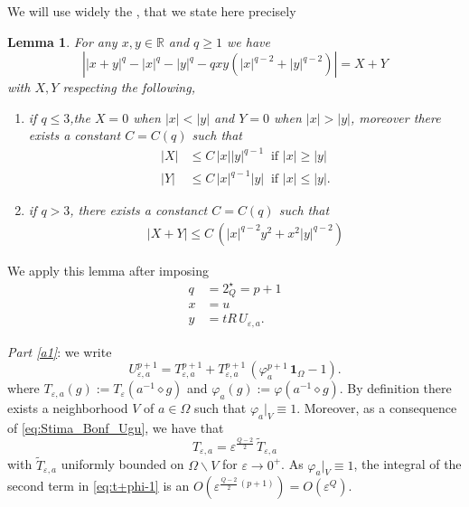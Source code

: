 \documentclass[11pt]{amsart}
\numberwithin{equation}{section} %
\newtheorem{lemma}[teo]{Lemma}
\theoremstyle{definition}
\def\R{\mathbb{R}}
\newcommand{\m}{\mbox}
\begin{document}
We will use widely the
\cite[Lemma 4]{BrezisNirenberg}, that we state here precisely

\begin{lemma}\label{lemmetto}
    For any $x,y\in \R$ and $q\geq1$ we have
    \[
        \left||x+y|^q
        -|x|^q-|y|^q
        -qxy(|x|^{q-2}+|y|^{q-2})
        \right|
        =
        X+Y
    \]
    with $X,Y$ respecting the following,
    \begin{enumerate}
        \item if $q\leq 3$,the $X=0$ when $|x|<|y|$ and $Y=0$ when $|x|>|y|$,
        moreover there exists a constant $C=C(q)$ such that 
        \begin{align*}
            |X|&\leq C\, |x||y|^{q-1}\ \m{ if }|x|\geq |y|\\
            |Y|&\leq C\, |x|^{q-1}|y|\ \m{ if }|x|\leq |y|.
        \end{align*}
        \item if $q>3$, there exists a constanct $C=C(q)$ such that 
        \begin{align*}
            |X+Y|\leq C\, \left(
            |x|^{q-2}y^2+x^2|y|^{q-2}
            \right)
        \end{align*}
    \end{enumerate}
\end{lemma}
We apply this lemma after imposing
\begin{align*}
    q&=2^\star_Q=p+1\\
    x&=u\\
    y&=tR\, U_{\varepsilon,a}.
\end{align*}

\textit{Part \eqref{a1}}:
we write
\begin{equation}\label{eq:t+phi-1}
U_{\varepsilon,a}^{p+1}=T_{\varepsilon,a}^{p+1}+T_{\varepsilon,a}^{p+1}\, (\varphi_a^{p+1}\, \mathbf{1}_\Omega-1).
\end{equation}
where $T_{\varepsilon,a}(g):=T_{\varepsilon}(a^{-1}\diamond g)$
and $\varphi_a(g):=\varphi(a^{-1}\diamond g)$.
By definition there exists a neighborhood 
$V$ of $a\in\Omega$
such that $\varphi_a|_V\equiv 1$. Moreover, 
as a consequence of \eqref{eq:Stima_Bonf_Ugu}, we have that
$$T_{\varepsilon,a}=\varepsilon^{\frac{Q-2}{2}}\, \widetilde T_{\varepsilon,a}$$
\noindent with $\widetilde T_{\varepsilon,a}$ 
uniformly bounded on $\Omega\backslash V$ for $\varepsilon\to0^+$. As $\varphi_a|_V\equiv 1$, 
the integral of the second term in \eqref{eq:t+phi-1}
is an $O\left(\varepsilon^{\frac{Q-2}{2}\, (p+1)}\right)=O(\varepsilon^Q)$.\newline
\end{document}
